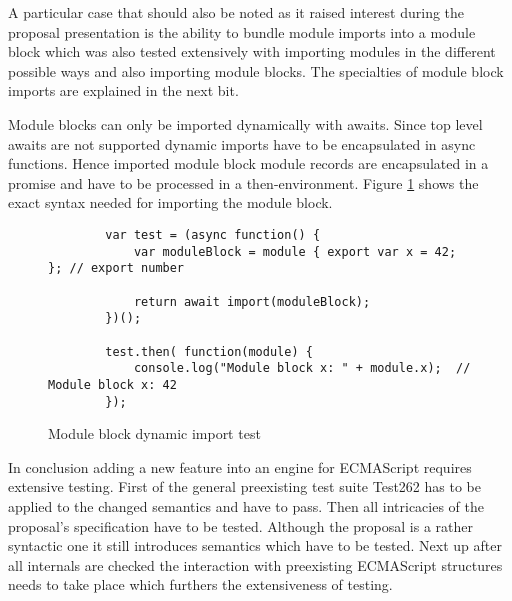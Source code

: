 A particular case that should also be noted as it raised interest during the proposal presentation is the ability to bundle module imports into a module block which was also tested extensively with importing modules in the different possible ways and also importing module blocks. The specialties of module block imports are explained in the next bit.

Module blocks can only be imported dynamically with awaits. Since top level awaits are not supported dynamic imports have to be encapsulated in async functions. Hence imported module block module records are encapsulated in a promise and have to be processed in a then-environment. Figure \ref{fig:testImp} shows the exact syntax needed for importing the module block.

\begin{figure}[h!]
    \begin{lstlisting}
        var test = (async function() {
            var moduleBlock = module { export var x = 42; }; // export number
            
            return await import(moduleBlock);
        })();
        
        test.then( function(module) {
            console.log("Module block x: " + module.x);  // Module block x: 42
        });
    \end{lstlisting}
    \caption{Module block dynamic import test}
    \label{fig:testImp}
\end{figure}

In conclusion adding a new feature into an engine for ECMAScript requires extensive testing. First of the general preexisting test suite Test262 has to be applied to the changed semantics and have to pass. Then all intricacies of the proposal's specification have to be tested. Although the proposal is a rather syntactic one it still introduces semantics which have to be tested. Next up after all internals are checked the interaction with preexisting ECMAScript structures needs to take place which furthers the extensiveness of testing.